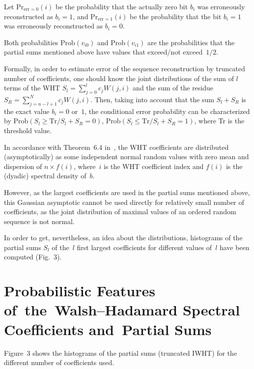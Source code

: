 \begin{multicols}{2}
Let $\mathrm{Pr}_{\mathrm{err}=0}(i)$ be the probability that the actually zero bit
$b_i$ was erroneously reconstructed as $b_i=1$, and
$\mathrm{Pr}_{\mathrm{err}=1}(i)$ be the probability that the bit $b_i=1$ was
erroneously reconstructed as $b_i=0$.

Both probabilities $\mathrm{Prob}\left(v_{i0}\right)$ and $\mathrm{Prob}\left(v_{i1}\right)$ are the
probabilities that the partial sums mentioned above have values that exceed/not exceed~$1/2$.

Formally, in order to estimate error of the sequence reconstruction by truncated number 
of coefficients, one should know the joint distributions of the sum of  $l$ terms  of the 
WHT $S_l = \sum\limits_{j=0}^{l} c_j W(j,i)$ and the sum of the residue 
$S_R =  \sum\limits_{j=n-l+1}^{N} c_j W(j,i)$. Then, taking into account that the sum 
$S_l + S_R $ is the exact value $b_i=0$ or~$1$,  the conditional error 
probability can be characterized by  $\mathrm{Prob}\left(S_l\ge \mathrm{Tr}/S_l +S_R=0\right)$, 
$\mathrm{Prob}\left(S_l\le \mathrm{Tr}/S_l +S_R=1\right)$, 
where Tr is the threshold value.

In accordance with Theorem~6.4 in~\cite{4-fr}, the WHT coefficients are distributed 
(asymptotically) as some
independent normal random values with zero mean and dispersion of
$n\times f(i)$, where~$i$ is the WHT coefficient index and $f(i)$
is the (dyadic) spectral density of~$b$.

However, as the largest coefficients are used in the partial sums mentioned above, 
this Gaussian  asymptotic cannot be used directly for relatively small number of 
coefficients, as the joint distribution of maximal values of an ordered random 
sequence  is not normal.

In order to get, nevertheless, an idea about the distributions, histograms 
of the partial sums $S_l$ of the~$l$ first largest coefficients for different values of~$l$ 
have been computed (Fig.~3).

\vspace*{-6pt}

\section{Probabilistic Features of~the~Walsh--Hadamard Spectral Coefficients and~Partial Sums}

\vspace*{-2pt}

\noindent
Figure~3 shows the histograms of  the partial sums (truncated IWHT) 
for the  different number of coefficients used.


\end{multicols}
